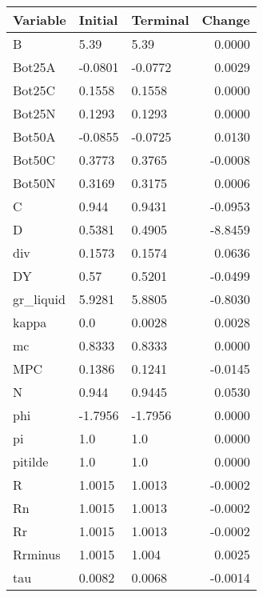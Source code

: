 \begin{table}
\centering
\label{tab:stst_comparison_end_L_wedge_permanent}
\begin{tabular}{lllr}
\toprule
                Variable & Initial & Terminal &  Change \\
\midrule
                       B &    5.39 &     5.39 &  0.0000 \\
                  Bot25A & -0.0801 &  -0.0772 &  0.0029 \\
                  Bot25C &  0.1558 &   0.1558 &  0.0000 \\
                  Bot25N &  0.1293 &   0.1293 &  0.0000 \\
                  Bot50A & -0.0855 &  -0.0725 &  0.0130 \\
                  Bot50C &  0.3773 &   0.3765 & -0.0008 \\
                  Bot50N &  0.3169 &   0.3175 &  0.0006 \\
                       C &   0.944 &   0.9431 & -0.0953 \\
                       D &  0.5381 &   0.4905 & -8.8459 \\
                     div &  0.1573 &   0.1574 &  0.0636 \\
                      DY &    0.57 &   0.5201 & -0.0499 \\
               gr\_liquid &  5.9281 &   5.8805 & -0.8030 \\
                   kappa &     0.0 &   0.0028 &  0.0028 \\
                      mc &  0.8333 &   0.8333 &  0.0000 \\
                     MPC &  0.1386 &   0.1241 & -0.0145 \\
                       N &   0.944 &   0.9445 &  0.0530 \\
                     phi & -1.7956 &  -1.7956 &  0.0000 \\
                      pi &     1.0 &      1.0 &  0.0000 \\
                 pitilde &     1.0 &      1.0 &  0.0000 \\
                       R &  1.0015 &   1.0013 & -0.0002 \\
                      Rn &  1.0015 &   1.0013 & -0.0002 \\
                      Rr &  1.0015 &   1.0013 & -0.0002 \\
                 Rrminus &  1.0015 &    1.004 &  0.0025 \\
                     tau &  0.0082 &   0.0068 & -0.0014 \\

\end{tabular}
\end{table}
